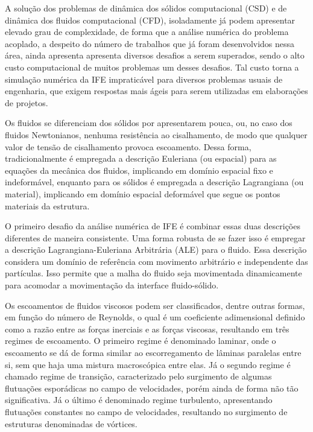 A solução dos problemas de dinâmica dos sólidos computacional (CSD) e de dinâmica dos fluidos computacional (CFD), isoladamente já podem apresentar elevado grau de complexidade, de forma que a análise numérica do problema acoplado, a despeito do número de trabalhos que já foram desenvolvidos nessa área, ainda apresenta apresenta diversos desafios a serem superados, sendo o alto custo computacional de muitos problemas um desses desafios. Tal custo torna a simulação numérica da IFE impraticável para diversos problemas usuais de engenharia, que exigem respostas mais ágeis para serem utilizadas em elaborações de projetos.

Os fluidos se diferenciam dos sólidos por apresentarem pouca, ou, no caso dos fluidos Newtonianos, nenhuma resistência ao cisalhamento, de modo que qualquer valor de tensão de cisalhamento provoca escoamento. Dessa forma, tradicionalmente é empregada a descrição Euleriana (ou espacial) para as equações da mecânica dos fluidos, implicando em domínio espacial fixo e indeformável, enquanto para os sólidos é empregada a descrição Lagrangiana (ou material), implicando em domínio espacial deformável que segue os pontos materiais da estrutura.

O primeiro desafio da análise numérica de IFE é combinar essas duas descrições diferentes de maneira consistente. Uma forma robusta de se fazer isso é empregar a descrição Lagrangiana-Euleriana Arbitrária (ALE) \cite{donea1982arbitrary} para o fluido. Essa descrição considera um domínio de referência com movimento arbitrário e independente das partículas. Isso permite que a malha do fluido seja movimentada dinamicamente para acomodar a movimentação da interface fluido-sólido.

Os escoamentos de fluidos viscosos podem ser classificados, dentre outras formas, em função do número de Reynolds, o qual é um coeficiente adimensional definido como a razão entre as forças inerciais e as forças viscosas, resultando em três regimes de escoamento. O primeiro regime é denominado laminar, onde o escoamento se dá de forma similar ao escorregamento de lâminas paralelas entre si, sem que haja uma mistura macroscópica entre elas. Já o segundo regime é chamado regime de transição, caracterizado pelo surgimento de algumas flutuações esporádicas no campo de velocidades, porém ainda de forma não tão significativa. Já o último é denominado regime turbulento, apresentando flutuações constantes no campo de velocidades, resultando no surgimento de estruturas denominadas de vórtices.

